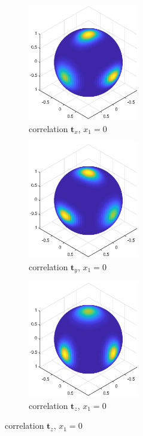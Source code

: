 \documentclass[12pt]{article}
\begin{document}
\begin{figure}
	\centering
	\begin{subfigure}{0.3\textwidth}
		\centering
		\includegraphics[height=2in]{x0}
		\caption{correlation $\bm{t}_x$, $x_1=0$}
	\end{subfigure}
	\begin{subfigure}{0.3\textwidth}
		\centering
		\includegraphics[height=2in]{y0}
		\caption{correlation $\bm{t}_y$, $x_1=0$}
	\end{subfigure}
	\begin{subfigure}{0.3\textwidth}
		\centering
		\includegraphics[height=2in]{z0}
		\caption{correlation $\bm{t}_z$, $x_1=0$}
	\end{subfigure}
	

\end{figure}
\end{document}

